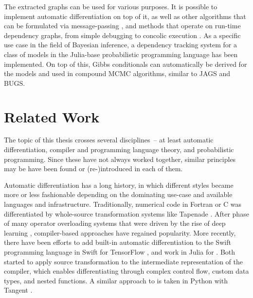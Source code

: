 The extracted graphs can be used for various purposes.  It is possible to implement automatic
differentiation on top of it, as well as other algorithms that can be formulated via message-passing
\parencite{minka2019automatic,minka2005divergence}, and methods that operate on run-time dependency
graphs, from simple debugging to concolic execution \parencite{sen2005cute,zeller2019concolic}.  As
a specific use case in the field of Bayesian inference, a dependency tracking system for a class of
models in the Julia-base probabilistic programming language \turingjl{} has been implemented.  On
top of this, Gibbs conditionals can automatically be derived for the models and used in compound
MCMC algorithms, similar to JAGS and BUGS.


\section{Related Work}
\label{sec:related-work}

The topic of this thesis crosses several disciplines~-- at least automatic differentiation, compiler
and programming language theory, and probabilistic programming.  Since these have not always worked
together, similar principles may be have been found or (re-)introduced in each of them.

Automatic differentiation has a long history, in which different styles became more or less
fashionable depending on the dominating use-case and available languages and infrastructure.
Traditionally, numerical code in Fortran or C was differentiated by whole-source transformation
systems like Tapenade \parencite{tapenadedevelopers2019tapenade}.  After phase of many operator
overloading systems that were driven by the rise of deep learning
\parencite{abadi2015tensorflow,paszke2017automatic,neubig2017dynet,tokui2015chainer}, compiler-based
approaches have regained popularity.  More recently, there have been efforts to add built-in
automatic differentiation to the Swift programming language in Swift for TensorFlow
\parencite{tensorflowdevelopers2018swift}, and work in Julia for 
\parencite{innes2018don}.  Both started to apply source transformation to the intermediate
representation of the compiler, which enables differentiating through complex control flow, custom
data types, and nested functions.  A similar approach to  is taken in Python
with Tangent \parencite{vanmerrienboer2018tangent}.

